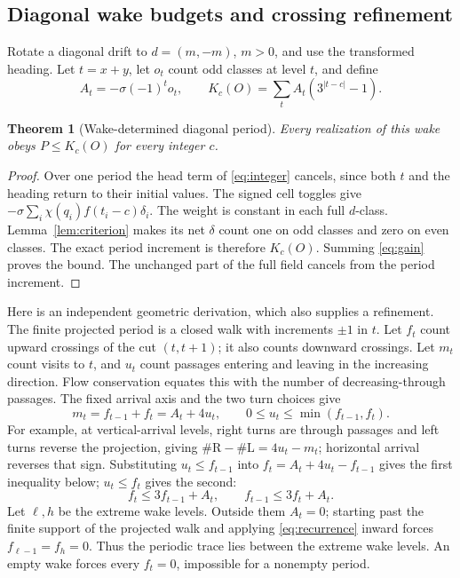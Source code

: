 \documentclass[11pt]{article}
\newtheorem{theorem}{Theorem}[section]
\theoremstyle{definition}\newtheorem{definition}[theorem]{Definition}
\newcommand{\R}{\mathrm R}
\newcommand{\Lturn}{\mathrm L}
\begin{document}
\subsection{Diagonal wake budgets and crossing refinement}
Rotate a diagonal drift to $d=(m,-m)$, $m>0$, and use the transformed heading.
Let $t=x+y$, let $o_t$ count odd classes at level $t$, and define
\begin{equation}\label{eq:A}
 A_t=-\sigma(-1)^t o_t,\qquad
 K_c(O)=\sum_t A_t(3^{|t-c|}-1).
\end{equation}
\begin{theorem}[Wake-determined diagonal period]\label{thm:diagonal}
Every realization of this wake obeys $P\le K_c(O)$ for every integer $c$.
\end{theorem}
\begin{proof}
Over one period the head term of \eqref{eq:integer} cancels, since both $t$ and
the heading return to their initial values. The signed cell toggles give
$-\sigma\sum_i\chi(q_i)f(t_i-c)\delta_i$.
The weight is constant in each full $d$-class. Lemma~\ref{lem:criterion} makes
its net $\delta$ count one on odd classes and zero on even classes. The exact
period increment is therefore $K_c(O)$. Summing \eqref{eq:gain} proves the bound.
The unchanged part of the full field cancels from the period increment.
\end{proof}

Here is an independent geometric derivation, which also supplies a refinement.
The finite projected period is a closed walk with increments $\pm1$ in $t$.
Let $f_t$ count upward crossings of the cut $(t,t+1)$; it also counts downward
crossings. Let $m_t$ count visits to $t$, and $u_t$ count passages entering and
leaving in the increasing direction. Flow conservation equates this with the
number of decreasing-through passages. The fixed arrival axis and the two
turn choices give
\begin{equation}\label{eq:flow}
 m_t=f_{t-1}+f_t=A_t+4u_t,\qquad
 0\le u_t\le\min(f_{t-1},f_t).
\end{equation}
For example, at vertical-arrival levels, right turns are through passages and
left turns reverse the projection, giving $\#\R-\#\Lturn=4u_t-m_t$; horizontal
arrival reverses that sign. Substituting $u_t\le f_{t-1}$ into
$f_t=A_t+4u_t-f_{t-1}$ gives the first inequality below; $u_t\le f_t$
gives the second:
\begin{equation}\label{eq:recurrence}
 f_t\le3f_{t-1}+A_t,\qquad f_{t-1}\le3f_t+A_t.
\end{equation}
Let $\ell,h$ be the extreme wake levels. Outside them $A_t=0$; starting past the
finite support of the projected walk and applying \eqref{eq:recurrence} inward
forces $f_{\ell-1}=f_h=0$. Thus the periodic trace lies between the extreme wake levels. An empty wake forces every
$f_t=0$, impossible for a nonempty period.
\end{document}
